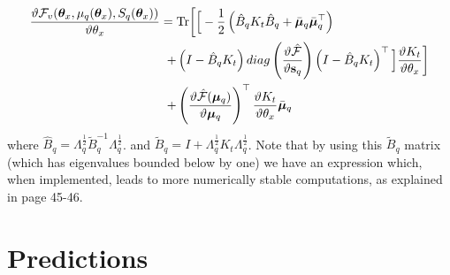 \documentclass{article} %
\begin{document}
\begin{align}
\frac{\vartheta \mathcal{F}_v(\boldsymbol \theta_x, \mu_q(\boldsymbol \theta_x), S_q(\boldsymbol \theta_x))}{\vartheta \theta_x}
={}& \text{Tr} \bigg[
\Big[ - \frac{1}{2} \left( \hat{B}_q K_t \hat{B}_q + \bar{\boldsymbol \mu}_q \bar{\boldsymbol \mu}_q^{\top} \right) \nonumber \\
+{}& \left( I - \hat{B}_q K_t \right)
 diag \left(  \frac{\vartheta \hat{\mathcal{F}}}{\vartheta \mathbf{s}_q} \right)
			 \left( I - \hat{B}_q K_t \right)^{\top} \Big]
			  \frac{\vartheta K_t}{\vartheta \theta_x} \bigg] 	\nonumber \\	
+{}&  \left( \frac{\vartheta \hat{\mathcal{F}}( \boldsymbol \mu_q)}{\vartheta \boldsymbol \mu_q} \right)^{\top}
					\frac{\vartheta K_t}{\vartheta \theta_x} \bar{\boldsymbol \mu}_q 
\label{CompleteBoundDerivThetatB}
\end{align}
where $\hat{B}_q = \Lambda_q^{\frac{1}{2}} \widetilde{B}_q^{-1} \Lambda_q^{\frac{1}{2}}$.
and $\tilde{B}_q = I + \Lambda_q^{\frac{1}{2}} K_t \Lambda_q^{\frac{1}{2}}$. Note that by using this
$\tilde{B}_q$ matrix (which has eigenvalues bounded below by one) we have an expression which, when implemented, leads to more numerically stable computations, as explained in \cite{rasmussen-williams} page 45-46. 




\section{Predictions}
\end{document}
